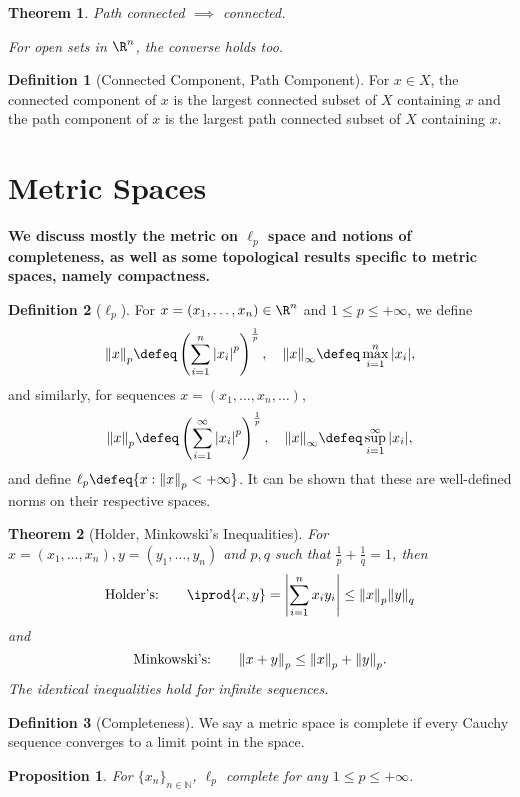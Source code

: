 \documentclass[12pt, oneside]{article}
\theoremstyle{definition}
\newtheorem{defn}{Definition}
\theoremstyle{plain}
\newtheorem{thm}{Theorem}
\newtheorem{prop}{Proposition}
\theoremstyle{remark}
\let\origsection=\section
\renewcommand\section[1]{\origsection{#1}\label{sec:\thesection}}
\begin{document}
\begin{thm}
  Path connected $\implies$ connected.

  For open sets in $\R^n$, the converse holds too.
\end{thm}

\begin{defn}[Connected Component, Path Component]
  For $x \in X$, the connected component of $x$ is the largest connected subset of $X$ containing $x$ and the path component of $x$ is the largest path connected subset of $X$ containing $x$.
\end{defn}

\section{Metric Spaces}

\textbf{We discuss mostly the metric on $\ell_p$ space and notions of completeness, as well as some topological results specific to metric spaces, namely compactness.}

\begin{defn}[$\ell_p$]
  For $x = (x_1, \dots, x_n) \in \R^n$ and $1 \leq p \leq + \infty$, we define \[
  \norm{x}_p \defeq \left(\sum_{i=1}^n \abs{x_i}^p\right)^{\frac{1}{p}}, \quad \norm{x}_\infty \defeq \max_{i=1}^n \abs{x_i},
  \]
  and similarly, for sequences $x = (x_1, \dots, x_n, \dots)$, \[
  \norm{x}_p \defeq   \left(\sum_{i=1}^\infty \abs{x_i}^p\right)^{\frac{1}{p}}, \quad \norm{x}_\infty \defeq \sup_{i=1}^\infty \abs{x_i},
  \]
  and define $\ell_p \defeq \{x : \norm{x}_p < +\infty\}$. It can be shown that these are well-defined norms on their respective spaces.
\end{defn}

\begin{thm}[Holder, Minkowski's Inequalities]
  For $x = (x_1, \dots, x_n), y = (y_1, \dots, y_n)$ and $p, q$ such that $\frac{1}{p} + \frac{1}{q} = 1$, then \[
  \text{Holder's:} \qquad \iprod{x, y} = \abs{\sum_{i=1}^n x_i y_i} \leq \norm{x}_p \norm{y}_q  
  \]
  and \[
  \text{Minkowski's:} \qquad \norm{x + y}_p \leq \norm{x}_p + \norm{y}_p .
  \]
  The identical inequalities hold for infinite sequences.
\end{thm}

\begin{defn}[Completeness]
  We say a metric space is complete if every Cauchy sequence converges to a limit point in the space.
\end{defn}
\begin{prop}
  For $\{x_n\}_{n \in \mathbb{N}}$, $\ell_p$ complete for any $1 \leq p \leq +\infty$.
\end{prop}
\end{document}
